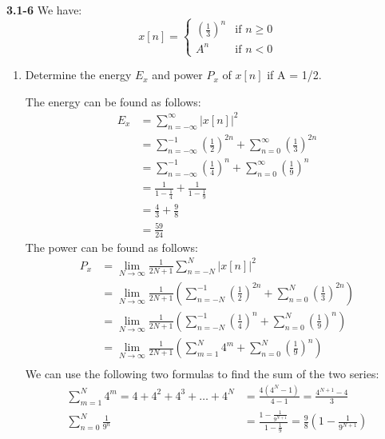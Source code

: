 \documentclass{article}
\begin{document}
\textbf{3.1-6}
We have:
\[
    x[n] = \begin{cases}
        \left(\frac{1}{3}\right)^n & \text{if } n \geq 0 \\
        A^n & \text{if } n < 0
    \end{cases}
\]
\begin{enumerate}[label=\alph*.]
    \item Determine the energy $E_x$ and power $P_x$ of $x[n]$ if A = 1/2.
    
    The energy can be found as follows:
    \begin{align*}
        E_x &= \sum_{n=-\infty}^{\infty} |x[n]|^2 \\
        &= \sum_{n=-\infty}^{-1} \left(\frac{1}{2}\right)^{2n} + \sum_{n=0}^{\infty} \left(\frac{1}{3}\right)^{2n} \\
        &= \sum_{n=-\infty}^{-1} \left(\frac{1}{4}\right)^{n} + \sum_{n=0}^{\infty} \left(\frac{1}{9}\right)^{n} \\
        &= \frac{1}{1 - \frac{1}{4}} + \frac{1}{1 - \frac{1}{9}} \\
        &= \frac{4}{3} + \frac{9}{8} \\
        &= \frac{59}{24}
    \end{align*}
    The power can be found as follows:
    \begin{align*}
        P_x &= \lim_{N \to \infty} \frac{1}{2N + 1} \sum_{n=-N}^{N} |x[n]|^2 \\
        &= \lim_{N \to \infty} \frac{1}{2N + 1} \left(\sum_{n=-N}^{-1} \left(\frac{1}{2}\right)^{2n} + \sum_{n=0}^{N} \left(\frac{1}{3}\right)^{2n}\right) \\
        &= \lim_{N \to \infty} \frac{1}{2N + 1} \left(\sum_{n=-N}^{-1} \left(\frac{1}{4}\right)^{n} + \sum_{n=0}^{N} \left(\frac{1}{9}\right)^{n}\right) \\   
        &= \lim_{N \to \infty} \frac{1}{2N + 1} \left(\sum_{m=1}^{N} 4^m + \sum_{n=0}^{N} \left(\frac{1}{9}\right)^{n}\right) \\
    \end{align*}
    We can use the following two formulas to find the sum of the two series:
    \begin{align*}
        \sum_{m=1}^{N} 4^m = 4 + 4^2 + 4^3 + \ldots + 4^N &= \frac{4(4^N - 1)}{4 - 1} = \frac{4^{N+1} - 4}{3} \\
        \sum_{n=0}^{N} \frac{1}{9^n} &= \frac{1 - \frac{1}{9^{N+1}}}{1 - \frac{1}{9}} = \frac{9}{8}\left(1 - \frac{1}{9^{N+1}}\right)
    \end{align*}


\end{enumerate}
\end{document}
